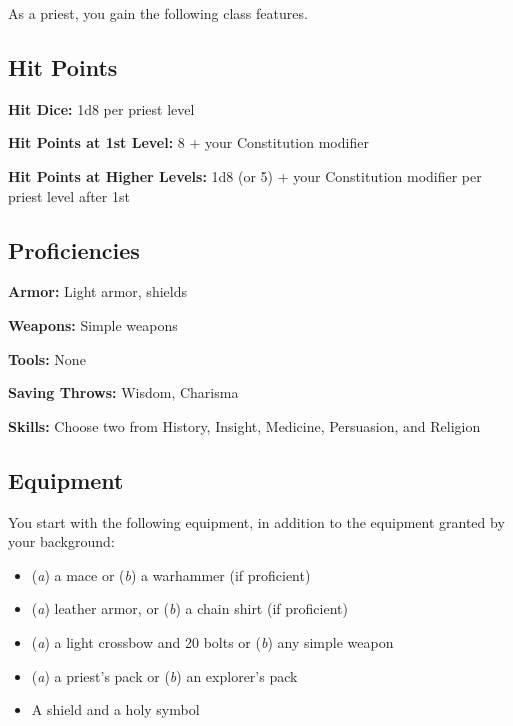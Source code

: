 As a priest, you gain the following class features.

\subsection{Hit Points}

\textbf{Hit Dice:} 1d8 per priest level

\textbf{Hit Points at 1st Level:} 8 + your Constitution modifier

\textbf{Hit Points at Higher Levels:} 1d8 (or 5) + your Constitution modifier per priest level after 1st

\subsection{Proficiencies}

\textbf{Armor:} Light armor, shields

\textbf{Weapons:} Simple weapons

\textbf{Tools:} None

\textbf{Saving Throws:} Wisdom, Charisma

\textbf{Skills:} Choose two from History, Insight, Medicine, Persuasion, and Religion

\subsection{Equipment}

You start with the following equipment, in addition to the equipment granted by your background:
\begin{itemize}
\item (\textit{a}) a mace or (\textit{b}) a warhammer (if proficient)
\item (\textit{a}) leather armor, or (\textit{b}) a chain shirt (if proficient)
\item (\textit{a}) a light crossbow and 20 bolts or (\textit{b}) any simple weapon
\item (\textit{a}) a priest's pack or (\textit{b}) an explorer's pack
\item A shield and a holy symbol
\end{itemize}

